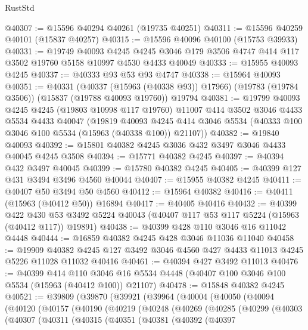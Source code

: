 \begin{lexlean}{RustStd}
\begin{coremodule}
{\begin{coremodule}
{{{{{{{{{{{{{{{{{{{{{{{{{{{{{{{{{{{{{{{{{{{{{{{{{{{{{{{{{{{{@40307 := @15596 @40294 @40261 (@19735 @40251)
@40311 := @15596 @40259 @40101 (@15837 @40257)
@40315 := @15596 @40096 @40100 (@15753 @39933)
@40331 := @19749
    @40093
    @4245
    @4245
    @3046
    @179
    @3506
    @4747
    @414
    @117
    @3502
    @19760
    @5158
    @10997
    @4530
    @4433
    @40049
@40333 := @15955 @40093 @4245
@40337 := @40333 @93 @53 @93 @4747
@40338 := @15964 @40093
@40351 := @40331
    (@40337 (@15963 (@40338 @93)) @17966)
    (@19783 (@19784 @3506))
    (@15837 (@19788 @40093 @19760))
    @19794
@40381 := @19799
    @40093
    @4245
    @4245
    (@19803 @10998 @117 @19760)
    @11007
    @414
    @3502
    @3046
    @4433
    @5534
    @4433
    @40047
    (@19819
      @40093
      @4245
      @414
      @3046
      @5534
      (@40333 @100 @3046 @100 @5534 (@15963 (@40338 @100)) @21107))
@40382 := @19840 @40093
@40392 := @15801 @40382 @4245 @3036 @432 @3497 @3046 @4433 @40045 @4245 @3508
@40394 := @15771 @40382 @4245
@40397 := @40394 @432 @3497 @40045
@40399 := @15780 @40382 @4245
@40405 := @40399 @127 @431 @3494 @3496 @4560 @40044
@40407 := @15955 @40382 @4245
@40411 := @40407 @50 @3494 @50 @4560
@40412 := @15964 @40382
@40416 := @40411 (@15963 (@40412 @50)) @16894
@40417 := @40405 @40416
@40432 := @40399
    @422
    @430
    @53
    @3492
    @5224
    @40043
    (@40407 @117 @53 @117 @5224 (@15963 (@40412 @117)) @19891)
@40438 := @40399 @428 @110 @3046 @16 @11042 @4448
@40444 := @16859 @40382 @4245 @428 @3046 @11036 @11040
@40458 := @19909
    @40382
    @4245
    @127
    @3492
    @3046
    @4560
    @427
    @4433
    @11013
    @4245
    @5226
    @11028
    @11032
    @40416
@40461 := @40394 @427 @3492 @11013
@40476 := @40399
    @414
    @110
    @3046
    @16
    @5534
    @4448
    (@40407 @100 @3046 @100 @5534 (@15963 (@40412 @100)) @21107)
@40478 := @15848 @40382 @4245
@40521 := @39809
    (@39870
      (@39921
        (@39964
          (@40004
            (@40050
              (@40094
                (@40120
                  (@40157
                    (@40190
                      (@40219
                        (@40248
                          (@40269
                            (@40285
                              (@40299
                                (@40303
                                  (@40307
                                    (@40311
                                      (@40315
                                        (@40351
                                          (@40381
                                            (@40392
                                              (@40397
}}}}}}}}}}}}}}}}}}}}}}}}}}}}}}}}}}}}}}}}}}}}}}}}}}}}}}}}}}}}
\end{coremodule}}
\end{coremodule}
\end{lexlean}
